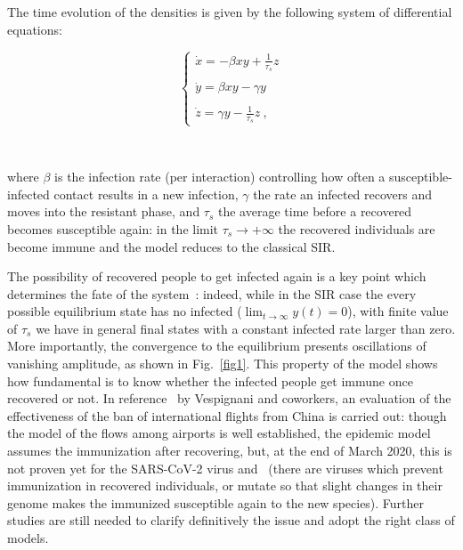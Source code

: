 \documentclass{article}
\begin{document}
The time evolution of the densities is given by the following system of differential equations:

\begin{equation}
\left\{
\begin{array}{l}
\dot x = -\beta xy + \frac{1}{\tau_s}z\\
\ \\
\dot y = \beta xy -\gamma y \\
\ \\
\dot z = \gamma y - \frac{1}{\tau_s}z \ ,
\end{array}
\right.
    \label{sirs}
\end{equation}

\ 

\noindent where $\beta$ is the infection rate (per interaction) controlling how often a susceptible-infected contact results in a new infection, $\gamma$ the rate an infected recovers and moves into the resistant phase, and $\tau_s$ the average time before a recovered becomes susceptible again: in the limit $\tau_s\rightarrow+\infty$ the recovered individuals are become immune and the model reduces to the classical SIR.

The possibility of recovered people to get infected again is a key point which determines the fate of the system~\cite{gon11}: indeed, while in the SIR case the every possible equilibrium state has no infected ($\lim_{t\rightarrow\infty}y(t)=0$), with finite value of $\tau_s$ we have in general final states with a constant infected rate larger than zero. More importantly, the convergence to the equilibrium presents oscillations of vanishing amplitude, as shown in Fig.~\ref{fig1}. This property of the model shows how fundamental is to know whether the infected people get immune once recovered or not. In reference~\cite{ves20} by Vespignani and coworkers, an evaluation of the effectiveness of the ban of international flights from China is carried out: though the model of the flows among airports is well established, the epidemic model assumes the immunization after recovering, but, at the end of March 2020, this is not proven yet for the SARS-CoV-2 virus and~\cite{che20} (there are viruses which prevent immunization in recovered individuals, or mutate so that slight changes in their genome makes the immunized susceptible again to the new species). Further studies are still needed to clarify definitively the issue and adopt the right class of models.
\end{document}
